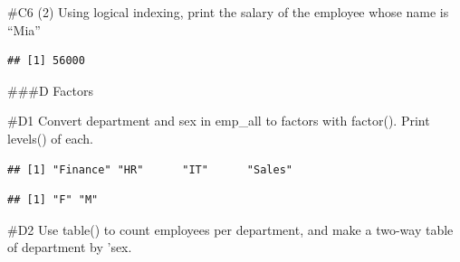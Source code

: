 \documentclass[
]{article}
\newenvironment{Shaded}{\begin{snugshade}}{\end{snugshade}}
\newcommand{\CommentTok}[1]{\textcolor[rgb]{0.56,0.35,0.01}{\textit{#1}}}
\newcommand{\FunctionTok}[1]{\textcolor[rgb]{0.13,0.29,0.53}{\textbf{#1}}}
\newcommand{\NormalTok}[1]{#1}
\newcommand{\OtherTok}[1]{\textcolor[rgb]{0.56,0.35,0.01}{#1}}
\newcommand{\SpecialCharTok}[1]{\textcolor[rgb]{0.81,0.36,0.00}{\textbf{#1}}}
\newcommand{\StringTok}[1]{\textcolor[rgb]{0.31,0.60,0.02}{#1}}
\begin{document}
\#C6 (2) Using logical indexing, print the salary of the employee whose
name is ``Mia''

\begin{Shaded}
\end{Shaded}

\begin{verbatim}
## [1] 56000
\end{verbatim}

\#\#\#D Factors

\#D1 Convert department and sex in emp\_all to factors with factor().
Print levels() of each.

\begin{Shaded}
\end{Shaded}

\begin{verbatim}
## [1] "Finance" "HR"      "IT"      "Sales"
\end{verbatim}

\begin{Shaded}
\end{Shaded}

\begin{verbatim}
## [1] "F" "M"
\end{verbatim}

\#D2 Use table() to count employees per department, and make a two-way
table of department by 'sex.
\end{document}

